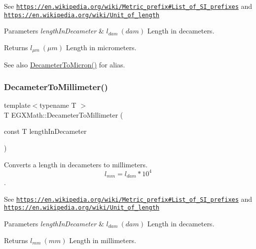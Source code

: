 See \href{https://en.wikipedia.org/wiki/Metric_prefix#List_of_SI_prefixes}{\tt https\+://en.\+wikipedia.\+org/wiki/\+Metric\+\_\+prefix\#\+List\+\_\+of\+\_\+\+S\+I\+\_\+prefixes} and \href{https://en.wikipedia.org/wiki/Unit_of_length}{\tt https\+://en.\+wikipedia.\+org/wiki/\+Unit\+\_\+of\+\_\+length} 
\begin{DoxyParams}{Parameters}
{\em length\+In\+Decameter} & $ l_{dam}\ (dam)$ Length in decameters. \\
\hline
\end{DoxyParams}
\begin{DoxyReturn}{Returns}
$ l_{\mu m}\ (\mu m)$ Length in micrometers. 
\end{DoxyReturn}
\begin{DoxySeeAlso}{See also}
\mbox{\hyperlink{group___e_g_x_math-_conversions-_length_conversions-_s_i-_decameter-_non-_s_i_gaf3c7befd051b823dc17aca5318cae689}{Decameter\+To\+Micron()}} for alias. 
\end{DoxySeeAlso}
\mbox{\label{group___e_g_x_math-_conversions-_length_conversions-_s_i-_decameter-_s_i_gaa1ebc69084f0d429e62a6af0ef509bb7}} 
\subsubsection{\texorpdfstring{Decameter\+To\+Millimeter()}{DecameterToMillimeter()}}
{\footnotesize\ttfamily template$<$typename T $>$ \\
T E\+G\+X\+Math\+::\+Decameter\+To\+Millimeter (\begin{DoxyParamCaption}\item[{const T}]{length\+In\+Decameter }\end{DoxyParamCaption})}



Converts a length in decameters to millimeters. \[ l_{mm}=l_{dam} * 10^{4} \]. 

See \href{https://en.wikipedia.org/wiki/Metric_prefix#List_of_SI_prefixes}{\tt https\+://en.\+wikipedia.\+org/wiki/\+Metric\+\_\+prefix\#\+List\+\_\+of\+\_\+\+S\+I\+\_\+prefixes} and \href{https://en.wikipedia.org/wiki/Unit_of_length}{\tt https\+://en.\+wikipedia.\+org/wiki/\+Unit\+\_\+of\+\_\+length} 
\begin{DoxyParams}{Parameters}
{\em length\+In\+Decameter} & $ l_{dam}\ (dam)$ Length in decameters. \\
\hline
\end{DoxyParams}
\begin{DoxyReturn}{Returns}
$ l_{mm}\ (mm)$ Length in millimeters. 
\end{DoxyReturn}
\mbox{\label{group___e_g_x_math-_conversions-_length_conversions-_s_i-_decameter-_s_i_gad2173f361037d8cfbdcc6b99c79a9105}} 

